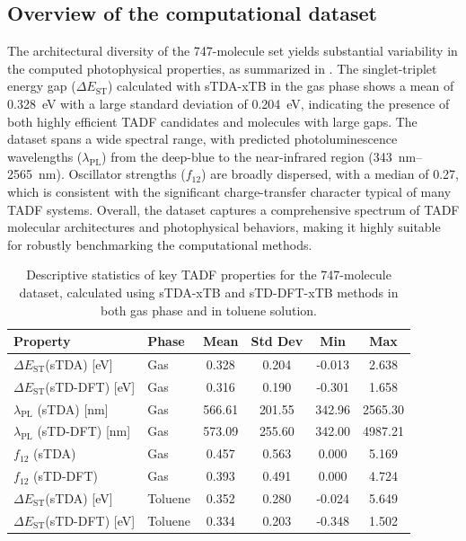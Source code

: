 \documentclass[journal=jcisd8,manuscript=article,keywords=true]{achemso}
\newcommand{\deltaest}{$\Delta E_{\text{ST}}$}
\begin{document}
\subsection{Overview of the computational dataset}

The architectural diversity of the \num{747}-molecule set yields substantial variability
in the computed photophysical properties, as summarized in .
The singlet-triplet energy gap (\deltaest) calculated with sTDA-xTB in the gas phase shows
a mean of \qty{0.328}{\electronvolt} with a large standard deviation of
\qty{0.204}{\electronvolt}, indicating the presence of both highly efficient TADF
candidates and molecules with large gaps. The dataset spans a wide spectral range, with
predicted photoluminescence wavelengths ($\lambda_{\text{PL}}$) from the deep-blue to the
near-infrared region (\qtyrange{343}{2565}{\nano\meter}). Oscillator strengths ($f_{12}$)
are broadly dispersed, with a median of \num{0.27}, which is consistent with the
significant charge-transfer character typical of many TADF systems. Overall, the dataset
captures a comprehensive spectrum of TADF molecular architectures and photophysical
behaviors, making it highly suitable for robustly benchmarking the computational methods.

\begin{table}[!ht]
\centering
\caption{Descriptive statistics of key TADF properties for the \num{747}-molecule dataset, calculated using sTDA-xTB and sTD-DFT-xTB methods in both gas phase 
and in toluene solution.}
\label{tab:descriptive_stats}
\begin{tabular}{l l *{4}{S[table-format=4.3]}}
	\toprule
	{Property}                         & {Phase} & {Mean} & {Std Dev} & {Min}  & {Max}
\\ \midrule
	\deltaest (sTDA) [\unit{\electronvolt}]              & Gas     & 0.328  & 0.204     & -0.013 &
2.638   \\
	\deltaest (sTD-DFT) [\unit{\electronvolt}]           & Gas     & 0.316  & 0.190     & -0.301 &
1.658   \\
	$\lambda_{\text{PL}}$ (sTDA) [\unit{\nano\meter}]    & Gas     & 566.61 & 201.55    & 342.96 &
2565.30 \\
	$\lambda_{\text{PL}}$ (sTD-DFT) [\unit{\nano\meter}] & Gas     & 573.09 & 255.60    & 342.00 &
4987.21 \\
	$f_{12}$ (sTDA)                    & Gas     & 0.457  & 0.563     & 0.000  & 5.169
\\
	$f_{12}$ (sTD-DFT)                 & Gas     & 0.393  & 0.491     & 0.000  & 4.724
\\ \midrule
	\deltaest (sTDA) [\unit{\electronvolt}]              & Toluene & 0.352  & 0.280     & -0.024 &
5.649   \\
	\deltaest (sTD-DFT) [\unit{\electronvolt}]           & Toluene & 0.334  & 0.203     & -0.348 &
1.502   \\ \bottomrule
\end{tabular}
\end{table}
\end{document}

